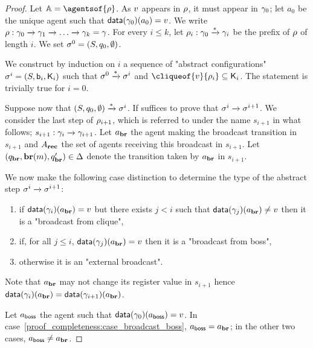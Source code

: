 \begin{proof}
	Let $\agents = \agentsof{\run}$.	
	As $v$ appears in $\rho$, it must appear in $\gamma_0$; let $a_0$ be the unique agent such that $\mathsf{data}(\gamma_0)(a_0) = v$. We write $\rho : \gamma_0 \xrightarrow{} \gamma_1 \xrightarrow{} \dots \xrightarrow{} \gamma_k = \gamma$. For every $i \leq k$, let $\rho_i : \gamma_0 \xrightarrow{*} \gamma_i$ be the prefix of $\rho$ of length $i$. We set $\sigma^0 = (S, q_0, \emptyset)$.
	
	We construct by induction on $i$ a sequence of "abstract configurations" $\sigma^i = (S, \mathsf{b}_i, \mathsf{K}_i)$ such that $\sigma^0 \xrightarrow{*} \sigma^i$ and $\cliqueof{\aval}{\run_i} \subseteq \clique_i$.
	The statement is trivially true for $i=0$. 
	
	Suppose now that $(S, q_0, \emptyset) \xrightarrow{*} \sigma^i$. 
	If suffices to prove that $\sigma^i \xrightarrow{} \sigma^{i+1}$. 
	We consider the last step of $\rho_{i+1}$, which is referred to under the name $s_{i+1}$ in what follows; $s_{i+1}: \gamma_i \xrightarrow{} \gamma_{i+1}$. Let $a_{\textbf{br}}$ the agent making the broadcast transition in $s_{i+1}$ and $A_{\textbf{rec}}$ the set of agents receiving this broadcast in $s_{i+1}$. Let $(q_{\textbf{br}}, \textbf{br}(m), q_{\textbf{br}}') \in \Delta$ denote the transition taken by $a_{\textbf{br}}$ in $s_{i+1}$.
	
	We now make the following case distinction to determine the type of the abstract step $\sigma^i \xrightarrow{} \sigma^{i+1}$:
	\begin{enumerate}
		\item\label{proof_completeness:case_broadcast_clique} if $\mathsf{data}(\gamma_{i})(a_{\textbf{br}}) = v$ but there exists $j<i$ such that $\mathsf{data}(\gamma_{j})(a_{\textbf{br}}) \ne v$ then it is a "broadcast from clique",
		\item\label{proof_completeness:case_broadcast_boss} if, for all $j \leq i$, $\mathsf{data}(\gamma_j)(a_{\textbf{br}}) = v$ then it is a "broadcast from boss",
		\item\label{proof_completeness:case_external_broadcast} otherwise it is an "external broadcast". 
	\end{enumerate}
	Note that $a_{\textbf{br}}$ may not change its register value in $s_{i+1}$ hence $\mathsf{data}(\gamma_i)(a_{\textbf{br}}) = \mathsf{data}(\gamma_{i+1})(a_{\textbf{br}})$. 
	
	Let $a_{\mathsf{boss}}$ the agent such that $\mathsf{data}(\gamma_0)(a_{\mathsf{boss}}) = v$. In case~\ref{proof_completeness:case_broadcast_boss}, $a_{\mathsf{boss}} = a_{\textbf{br}}$; in the other two cases, $a_{\mathsf{boss}} \ne a_{\textbf{br}}$. 
	

\end{proof}
